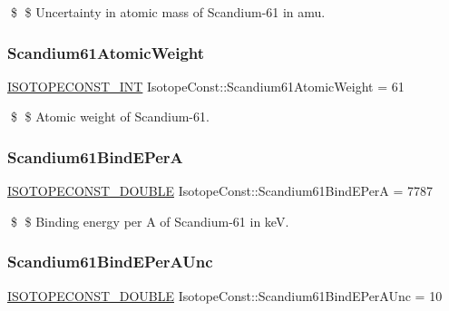\$ \$ Uncertainty in atomic mass of Scandium-\/61 in amu. \mbox{\label{group___isotope_const-_scandium-_sc61_ga2cedbe59fbbc5c5a9eeccf7d03f5f83b}} 
\subsubsection{\texorpdfstring{Scandium61\+Atomic\+Weight}{Scandium61AtomicWeight}}
{\footnotesize\ttfamily \mbox{\hyperlink{group___isotope_const-_macros_ga5f18360b3e99483a35c32d789e62621c}{I\+S\+O\+T\+O\+P\+E\+C\+O\+N\+S\+T\+\_\+\+I\+NT}} Isotope\+Const\+::\+Scandium61\+Atomic\+Weight = 61}

\$ \$ Atomic weight of Scandium-\/61. \mbox{\label{group___isotope_const-_scandium-_sc61_ga5f6ff690716f01feb1552534ef5199cb}} 
\subsubsection{\texorpdfstring{Scandium61\+Bind\+E\+PerA}{Scandium61BindEPerA}}
{\footnotesize\ttfamily \mbox{\hyperlink{group___isotope_const-_macros_ga8f45a7272ce02c0b4c65c44636ed719a}{I\+S\+O\+T\+O\+P\+E\+C\+O\+N\+S\+T\+\_\+\+D\+O\+U\+B\+LE}} Isotope\+Const\+::\+Scandium61\+Bind\+E\+PerA = 7787}

\$ \$ Binding energy per A of Scandium-\/61 in keV. \mbox{\label{group___isotope_const-_scandium-_sc61_ga506a6c52d6e279289a5661b6ee5e7c3a}} 
\subsubsection{\texorpdfstring{Scandium61\+Bind\+E\+Per\+A\+Unc}{Scandium61BindEPerAUnc}}
{\footnotesize\ttfamily \mbox{\hyperlink{group___isotope_const-_macros_ga8f45a7272ce02c0b4c65c44636ed719a}{I\+S\+O\+T\+O\+P\+E\+C\+O\+N\+S\+T\+\_\+\+D\+O\+U\+B\+LE}} Isotope\+Const\+::\+Scandium61\+Bind\+E\+Per\+A\+Unc = 10}

